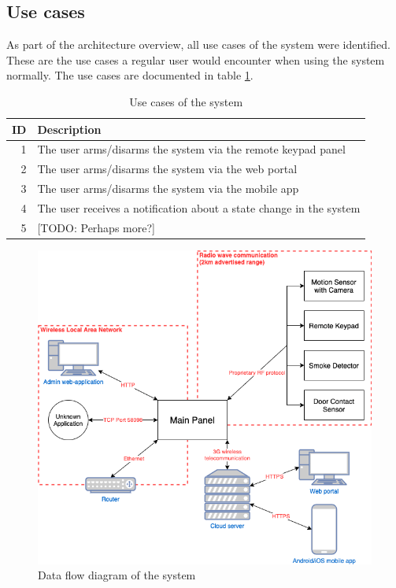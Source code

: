 \subsection{Use cases}
As part of the architecture overview, all use cases of the system were identified. These are the use cases a regular user would encounter when using the system normally. The use cases are documented in table \ref{tb:use-cases}.
\begin{table}[!ht]
    \centering
    \begin{tabularx}{\textwidth}{r X}
        \hline
        \textbf{ID} & \textbf{Description}
        \\ \hline
        1  & The user arms/disarms the system via the remote keypad panel
        \\
        2  & The user arms/disarms the system via the web portal
        \\
        3  & The user arms/disarms the system via the mobile app
        \\
        4  & The user receives a notification about a state change in the system
        \\
        5  & [TODO: Perhaps more?]
        \\ \hline
    \end{tabularx}
    \caption{Use cases of the system}
    \label{tb:use-cases}
\end{table}

\begin{figure}[!p]
    \centering
    \includegraphics[width=\textwidth]{images/system-overview.png}
    \caption{Data flow diagram of the system}
    \label{fig:system-overview}
\end{figure}

